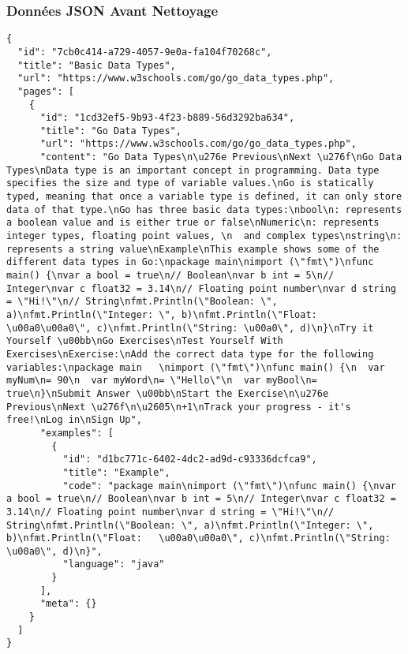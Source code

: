 \documentclass[12pt, a4paper]{article}
\begin{document}
\subsubsection*{Données JSON Avant Nettoyage}
\begin{lstlisting}[style=json, caption=Extrait de données brutes avant nettoyage, label=lst:json_before]
{
  "id": "7cb0c414-a729-4057-9e0a-fa104f70268c",
  "title": "Basic Data Types",
  "url": "https://www.w3schools.com/go/go_data_types.php",
  "pages": [
    {
      "id": "1cd32ef5-9b93-4f23-b889-56d3292ba634",
      "title": "Go Data Types",
      "url": "https://www.w3schools.com/go/go_data_types.php",
      "content": "Go Data Types\n\u276e Previous\nNext \u276f\nGo Data Types\nData type is an important concept in programming. Data type specifies the size and type of variable values.\nGo is statically typed, meaning that once a variable type is defined, it can only store data of that type.\nGo has three basic data types:\nbool\n: represents a boolean value and is either true or false\nNumeric\n: represents integer types, floating point values, \n  and complex types\nstring\n: represents a string value\nExample\nThis example shows some of the different data types in Go:\npackage main\nimport (\"fmt\")\nfunc main() {\nvar a bool = true\n// Boolean\nvar b int = 5\n// Integer\nvar c float32 = 3.14\n// Floating point number\nvar d string = \"Hi!\"\n// String\nfmt.Println(\"Boolean: \", a)\nfmt.Println(\"Integer: \", b)\nfmt.Println(\"Float:   \u00a0\u00a0\", c)\nfmt.Println(\"String: \u00a0\", d)\n}\nTry it Yourself \u00bb\nGo Exercises\nTest Yourself With Exercises\nExercise:\nAdd the correct data type for the following variables:\npackage main   \nimport (\"fmt\")\nfunc main() {\n  var myNum\n= 90\n  var myWord\n= \"Hello\"\n  var myBool\n= true\n}\nSubmit Answer \u00bb\nStart the Exercise\n\u276e Previous\nNext \u276f\n\u2605\n+1\nTrack your progress - it's free!\nLog in\nSign Up",
      "examples": [
        {
          "id": "d1bc771c-6402-4dc2-ad9d-c93336dcfca9",
          "title": "Example",
          "code": "package main\nimport (\"fmt\")\nfunc main() {\nvar a bool = true\n// Boolean\nvar b int = 5\n// Integer\nvar c float32 = 3.14\n// Floating point number\nvar d string = \"Hi!\"\n// String\nfmt.Println(\"Boolean: \", a)\nfmt.Println(\"Integer: \", b)\nfmt.Println(\"Float:   \u00a0\u00a0\", c)\nfmt.Println(\"String: \u00a0\", d)\n}",
          "language": "java"
        }
      ],
      "meta": {}
    }
  ]
}
\end{lstlisting}
\end{document}
